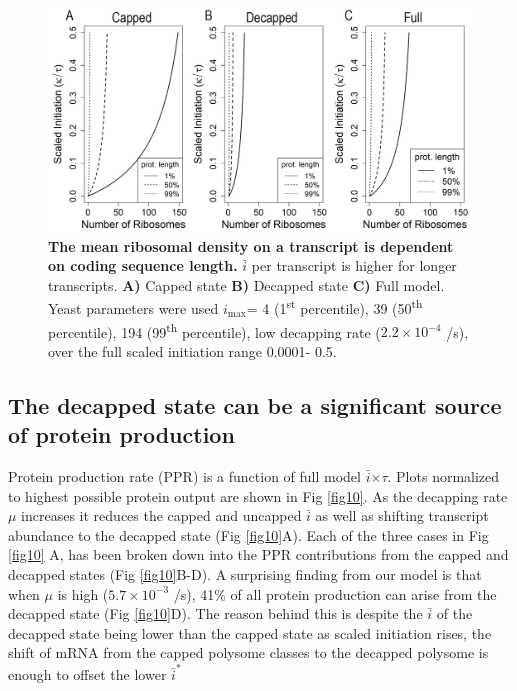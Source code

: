 \documentclass[10pt,letterpaper]{article}
\newcommand{\imax}{\ensuremath{{i_{\max}}}\xspace}
\newcommand{\MRL}{\ensuremath{\bar{i}}\xspace}
\begin{document}
\begin{figure}[!h]
\begin{center}
\includegraphics[width=120mm]{Images/MRL.png}
\caption{{\bf The mean ribosomal density on a transcript is dependent on coding sequence length.} 
\MRL per transcript is higher for longer transcripts. {\bf A)} Capped state {\bf B)} Decapped state {\bf C)} Full model. Yeast parameters were used \imax =  4 (1\textsuperscript{st} percentile),  39 (50\textsuperscript{th} percentile), 194 (99\textsuperscript{th} percentile), low decapping rate ($2.2\times 10^{-4}$ /s), over the full scaled initiation range 0.0001- 0.5.}
\label{fig9}
\end{center}
\end{figure}

\subsection*{The decapped state can be a significant source of protein production} 
Protein production rate (PPR) is a function of full model \MRL $\times \tau$. Plots normalized to highest possible protein output are shown in Fig \ref{fig10}.
As the decapping rate $\mu$ increases it reduces the capped and uncapped \MRL as well as shifting transcript abundance to the decapped state (Fig \ref{fig10}A).
Each of the three cases in Fig \ref{fig10} A, has been broken down into the PPR contributions from the capped and decapped states (Fig \ref{fig10}B-D). 
A surprising finding from our model is that when $\mu$ is high ($5.7\times 10^{-3}$ /s), 41\% of all protein production can arise from the decapped state (Fig \ref{fig10}D).
The reason behind this is despite the \MRL of the decapped state being lower than the capped state as scaled initiation rises, the shift of mRNA from the capped polysome classes to the decapped polysome is enough to offset the lower $\MRL^*$
\end{document}
